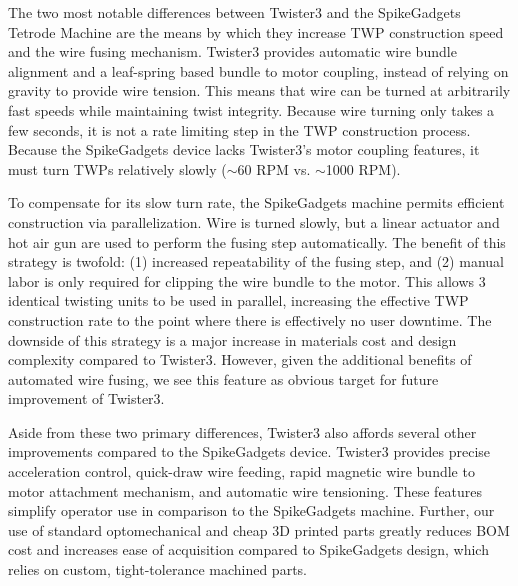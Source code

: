 \documentclass[11pt,a4paper]{article}
\begin{document}
The two most notable differences between Twister3 and the SpikeGadgets Tetrode
Machine are the means by which they increase TWP construction speed and the
wire fusing mechanism. Twister3 provides automatic wire bundle alignment and a
leaf-spring based bundle to motor coupling, instead of relying on gravity to
provide wire tension. This means that wire can be turned at arbitrarily fast
speeds while maintaining twist integrity. Because wire turning only takes a few
seconds, it is not a rate limiting step in the TWP construction process.
Because the SpikeGadgets device lacks Twister3's motor coupling features, it
must turn TWPs relatively slowly ($\sim$60 RPM vs. $\sim$1000 RPM).

To compensate for its slow turn rate, the SpikeGadgets machine permits
efficient construction via parallelization. Wire is turned slowly, but a linear
actuator and hot air gun are used to perform the fusing step automatically. The
benefit of this strategy is twofold: (1) increased repeatability of the fusing
step, and (2) manual labor is only required for clipping the wire bundle
to the motor. This allows 3 identical twisting units to be used in parallel,
increasing the effective TWP construction rate to the point where there is
effectively no user downtime. The downside of this strategy is a major increase
in materials cost and design complexity compared to Twister3. However, given
the additional benefits of automated wire fusing, we see this feature as
obvious target for future improvement of Twister3.

Aside from these two primary differences, Twister3 also affords several other
improvements compared to the SpikeGadgets device. Twister3 provides precise
acceleration control, quick-draw wire feeding, rapid magnetic wire bundle to
motor attachment mechanism, and automatic wire tensioning. These features
simplify operator use in comparison to the SpikeGadgets machine. Further, our
use of standard optomechanical and cheap 3D printed parts greatly reduces BOM
cost and increases ease of acquisition compared to SpikeGadgets design, which
relies on custom, tight-tolerance machined parts.
\end{document}
